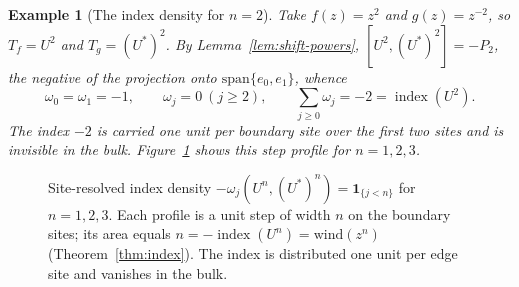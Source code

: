 \documentclass[10pt]{amsart}
\newcommand{\1}{{\mathbb{I}}}
\newcommand{\ind}{\operatorname{index}}
\newtheorem{example}[theorem]{Example}
\numberwithin{equation}{section}
\begin{document}
\begin{example}[The index density for $n=2$]\label{ex:n2}
Take $f(z)=z^2$ and $g(z)=z^{-2}$, so $T_f=U^2$ and $T_g=(U^*)^2$. By
Lemma~\ref{lem:shift-powers}, $[U^2,(U^*)^2]=-P_2$, the negative of the projection onto
$\mathrm{span}\{e_0,e_1\}$, whence
\[
\omega_0=\omega_1=-1,\qquad \omega_j=0\ (j\ge2),\qquad
\sum_{j\ge0}\omega_j=-2=\ind(U^2).
\]
The index $-2$ is carried one unit per boundary site over the first two sites and is invisible in
the bulk. Figure~\ref{fig:index-density} shows this step profile for $n=1,2,3$.
\end{example}

\begin{figure}[htbp]
\centering
{}
\caption{Site-resolved index density $-\omega_j(U^n,(U^*)^n)=\mathbf{1}_{\{j<n\}}$ for
$n=1,2,3$. Each profile is a unit step of width $n$ on the boundary sites; its area equals
$n=-\ind(U^n)=\mathrm{wind}(z^n)$ (Theorem~\ref{thm:index}). The index is distributed
one unit per edge site and vanishes in the bulk.}
\label{fig:index-density}
\end{figure}
\end{document}
